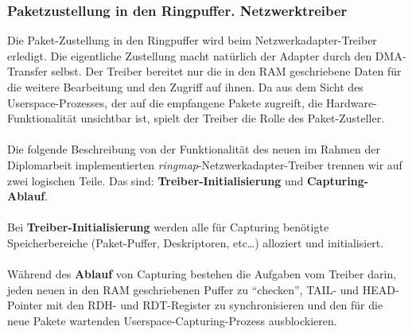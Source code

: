 \subsubsection{Paketzustellung in den Ringpuffer. Netzwerktreiber}
Die Paket-Zustellung in den Ringpuffer wird beim Netzwerkadapter-Treiber
erledigt. Die eigentliche Zustellung macht natürlich der Adapter durch den
DMA-Transfer selbst.  Der Treiber bereitet nur die in den RAM geschriebene
Daten für die weitere Bearbeitung und den Zugriff auf ihnen.  Da aus dem Sicht
des Userspace-Prozesses, der auf die empfangene Pakete zugreift, die
Hardware-Funktionalität unsichtbar ist, spielt der Treiber die Rolle des
Paket-Zusteller.\\\\
%
Die folgende Beschreibung von der Funktionalität des neuen im Rahmen der
Diplomarbeit implementierten \emph{ringmap}-Netzwerkadapter-Treiber trennen wir auf zwei logischen
Teile. Das sind: \textbf{Treiber-Initialisierung} und
\textbf{Capturing-Ablauf}.\\\\ 
%
Bei \textbf{Treiber-Initialisierung} werden alle für Capturing benötigte Speicherbereiche 
(Paket-Puffer, Deskriptoren, etc\ldots) alloziert und initialisiert.\\\\
%
Während des \textbf{Ablauf} von Capturing bestehen die Aufgaben vom Treiber
darin, jeden neuen in den RAM geschriebenen Puffer zu ``checken'', TAIL- und
HEAD-Pointer mit den RDH- und RDT-Register zu synchronisieren und den für die
neue Pakete wartenden Userspace-Capturing-Prozess ausblockieren.

